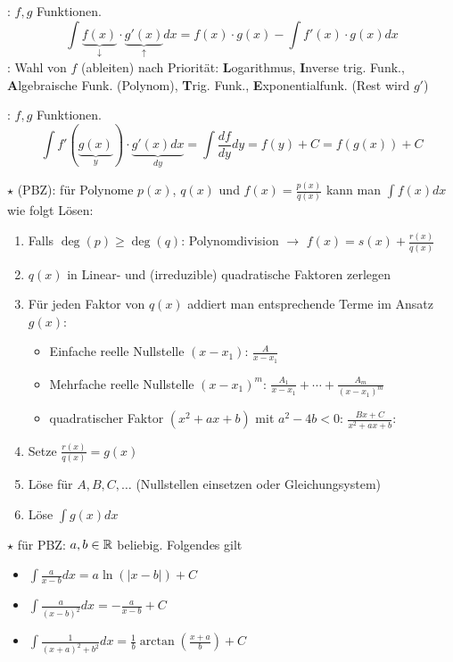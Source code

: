 \Satz {}: $f, g$ Funktionen.
$$\int \underbrace{f(x)}_{\downarrow}\cdot\underbrace{g'(x)}_{\uparrow} dx = f(x) \cdot g(x) - \int f'(x) \cdot g(x) dx$$
\Def {}: Wahl von $f$ (ableiten) nach Priorität: \textbf{L}ogarithmus, \textbf{I}nverse trig. Funk.,
\textbf{A}lgebraische Funk. (Polynom), \textbf{T}rig. Funk., \textbf{E}xponentialfunk. (Rest wird $g'$)

\Satz {}: $f, g$ Funktionen.
$$\int f'(\underbrace{g(x)}_y) \cdot \underbrace{g'(x) dx}_{dy} = \int \frac{df}{dy} dy = f(y) + C = f(g(x)) + C$$

\Satz $\star$  (PBZ): für Polynome $p(x)$, $q(x)$ und $f(x) = \frac{p(x)}{q(x)}$
kann man $\displaystyle \int f(x) dx$ wie folgt Lösen:
\vspace{-0.6em}
\begin{enumerate}
    \item Falls $\deg(p) \ge \deg(q)$: Polynomdivision $\to$ $f(x) = s(x) + \frac{r(x)}{q(x)}$
    \item $q(x)$ in Linear- und (irreduzible) quadratische Faktoren zerlegen
    \item Für jeden Faktor von $q(x)$ addiert man entsprechende Terme im Ansatz $g(x)$:
    \begin{itemize}
        \item Einfache reelle Nullstelle $(x - x_1)$: $\frac{A}{x - x_1}$
        \item Mehrfache reelle Nullstelle $(x -x_1)^m$: $\frac{A_1}{x - x_1} + \cdots + \frac{A_m}{(x - x_1)^m}$
        \item quadratischer Faktor $(x^2 + ax + b)$ mit $a^2 - 4b < 0$: $\frac{Bx + C}{x^2 + ax + b}$:
    \end{itemize}
    \item Setze $\frac{r(x)}{q(x)} = g(x)$
    \item Löse für $A, B, C, \ldots$ (Nullstellen einsetzen oder Gleichungsystem)
    \item Löse $\displaystyle \int g(x) dx$
\end{enumerate}

\Satz $\star$  für PBZ: $a, b \in \mathbb{R}$ beliebig. Folgendes gilt
\vspace{-0.6em}
\begin{itemize}
    \item $\displaystyle \int \frac{a}{x - b} dx = a \ln(|x - b|) + C$
    \item $\displaystyle \int \frac{a}{(x - b)^2} dx = -\frac{a}{x-b} + C$
    \item $\displaystyle \int \frac{1}{(x + a)^2 + b^2} dx = \frac{1}{b} \arctan(\frac{x + a}{b}) + C$
\end{itemize}

